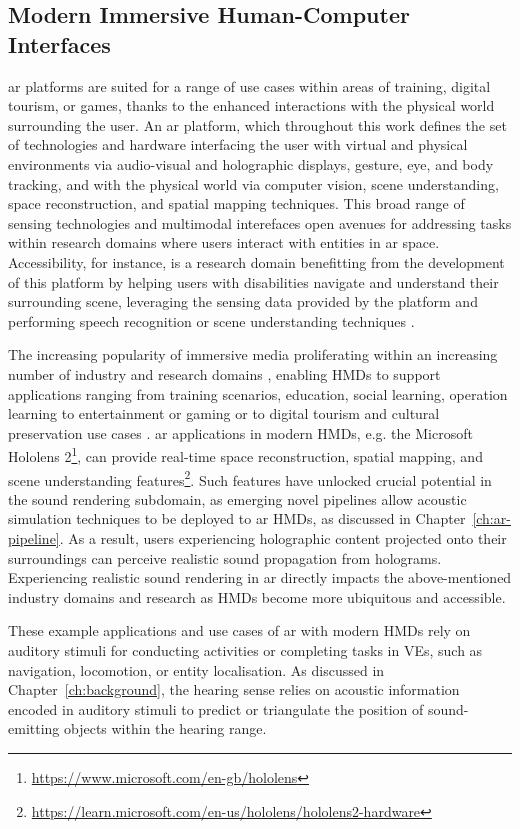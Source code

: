 \subsection{Modern Immersive Human-Computer Interfaces}
\acrshort{ar} platforms are suited for a range of use cases within areas of training, digital tourism, or games, thanks to the enhanced interactions with the physical world surrounding the user. An \acrshort{ar} platform, which throughout this work defines the set of technologies and hardware interfacing the user with virtual and physical environments via audio-visual and holographic displays, gesture, eye, and body tracking, and with the physical world via computer vision, scene understanding, space reconstruction, and spatial mapping techniques. This broad range of sensing technologies and multimodal interefaces open avenues for addressing tasks within research domains where users interact with entities in \acrshort{ar} space. Accessibility, for instance, is a research domain benefitting from the development of this platform by helping users with disabilities navigate and understand their surrounding scene, leveraging the sensing data provided by the platform and performing speech recognition or scene understanding techniques \citep{mehra2020potential}.\par
The increasing popularity of immersive media proliferating within an increasing number of industry and research domains \citep{park2022metaverse}, enabling HMDs to support applications ranging from training scenarios, education, social learning, operation learning \citep{harris2020effect, ahir2020application} to entertainment or gaming \citep{yuen2011augmented, ke2018virtual} or to digital tourism and cultural preservation use cases \citep{schofield2018viking, selmanovic2020cultural}. \acrshort{ar} applications in modern HMDs, e.g. the Microsoft Hololens 2\footnote{\url{https://www.microsoft.com/en-gb/hololens}\label{note:ms-hl2}}, can provide real-time space reconstruction, spatial mapping, and scene understanding features\footnote{\url{https://learn.microsoft.com/en-us/hololens/hololens2-hardware}\label{note:ms-hl2-hw}}. Such features have unlocked crucial potential in the sound rendering subdomain, as emerging novel pipelines allow acoustic simulation techniques to be deployed to \acrshort{ar} HMDs, as discussed in Chapter~\ref{ch:ar-pipeline}. As a result, users experiencing holographic content projected onto their surroundings can perceive realistic sound propagation from holograms. Experiencing realistic sound rendering in \acrshort{ar} directly impacts the above-mentioned industry domains and research as HMDs become more ubiquitous and accessible.\par
These example applications and use cases of \acrshort{ar} with modern HMDs rely on auditory stimuli for conducting activities or completing tasks in VEs, such as navigation, locomotion, or entity localisation. As discussed in Chapter~\ref{ch:background}, the hearing sense relies on acoustic information encoded in auditory stimuli to predict or triangulate the position of sound-emitting objects within the hearing range.

